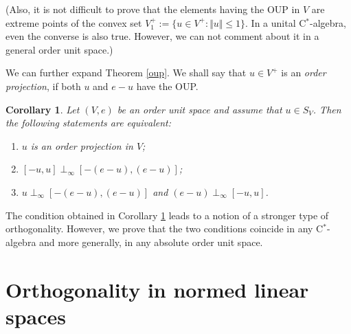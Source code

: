 \documentclass[12pt]{amsart}
\newtheorem{corollary}[theorem]{Corollary}
\begin{document}
(Also, it is not difficult to prove that the elements having the OUP in $V$ are extreme points of the convex set $V_1^+ := \lbrace u \in V^+: \Vert u \Vert \le 1 \rbrace$. In a unital C$^*$-algebra, even the converse is also true. However, we can not comment about it in a general order unit space.) 

We can further expand Theorem \ref{oup}. We shall say that $u \in V^+$ is an \emph{order projection}, if both $u$ and $e - u$ have the OUP.
\begin{corollary}\label{poud}
	Let $(V, e)$ be an order unit space and assume that $u \in S_V$. Then the following statements are equivalent: 
	\begin{enumerate}
		\item $u$ is an order projection in $V$; 
		\item $[- u, u] \perp_{\infty} [- (e - u), (e - u)]$; 
		\item $u \perp_{\infty} [- (e - u), (e - u)]$ and $(e - u) \perp_{\infty} [- u, u]$. 
	\end{enumerate}
\end{corollary} 
The condition obtained in Corollary \ref{poud} leads to a notion of a stronger type of orthogonality. However, we prove that the two conditions coincide in any C$^*$-algebra and more generally, in any absolute order unit space. 

\section{Orthogonality in normed linear spaces} 
\end{document}
